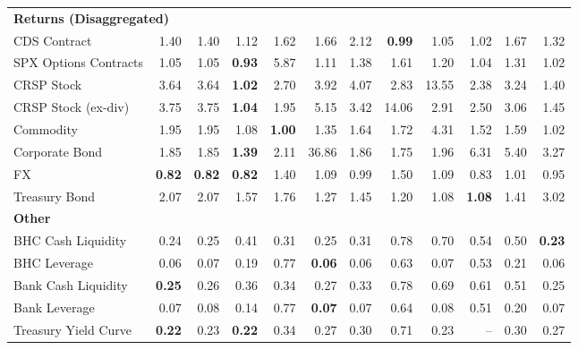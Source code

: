 \begin{table}[htbp]
\begin{tabular}{@{}lrrrrrrrrrrr@{}}
\midrule
\multicolumn{12}{l}{\textbf{Returns (Disaggregated)}} \\
CDS Contract & 1.40 & 1.40 & 1.12 & 1.62 & 1.66 & 2.12 & \textbf{0.99} & 1.05 & 1.02 & 1.67 & 1.32 \\
SPX Options Contracts & 1.05 & 1.05 & \textbf{0.93} & 5.87 & 1.11 & 1.38 & 1.61 & 1.20 & 1.04 & 1.31 & 1.02 \\
CRSP Stock & 3.64 & 3.64 & \textbf{1.02} & 2.70 & 3.92 & 4.07 & 2.83 & 13.55 & 2.38 & 3.24 & 1.40 \\
CRSP Stock (ex-div) & 3.75 & 3.75 & \textbf{1.04} & 1.95 & 5.15 & 3.42 & 14.06 & 2.91 & 2.50 & 3.06 & 1.45 \\
Commodity & 1.95 & 1.95 & 1.08 & \textbf{1.00} & 1.35 & 1.64 & 1.72 & 4.31 & 1.52 & 1.59 & 1.02 \\
Corporate Bond & 1.85 & 1.85 & \textbf{1.39} & 2.11 & 36.86 & 1.86 & 1.75 & 1.96 & 6.31 & 5.40 & 3.27 \\
FX & \textbf{0.82} & \textbf{0.82} & \textbf{0.82} & 1.40 & 1.09 & 0.99 & 1.50 & 1.09 & 0.83 & 1.01 & 0.95 \\
Treasury Bond & 2.07 & 2.07 & 1.57 & 1.76 & 1.27 & 1.45 & 1.20 & 1.08 & \textbf{1.08} & 1.41 & 3.02 \\
\midrule
\multicolumn{12}{l}{\textbf{Other}} \\
BHC Cash Liquidity & 0.24 & 0.25 & 0.41 & 0.31 & 0.25 & 0.31 & 0.78 & 0.70 & 0.54 & 0.50 & \textbf{0.23} \\
BHC Leverage & 0.06 & 0.07 & 0.19 & 0.77 & \textbf{0.06} & 0.06 & 0.63 & 0.07 & 0.53 & 0.21 & 0.06 \\
Bank Cash Liquidity & \textbf{0.25} & 0.26 & 0.36 & 0.34 & 0.27 & 0.33 & 0.78 & 0.69 & 0.61 & 0.51 & 0.25 \\
Bank Leverage & 0.07 & 0.08 & 0.14 & 0.77 & \textbf{0.07} & 0.07 & 0.64 & 0.08 & 0.51 & 0.20 & 0.07 \\
Treasury Yield Curve & \textbf{0.22} & 0.23 & \textbf{0.22} & 0.34 & 0.27 & 0.30 & 0.71 & 0.23 & -- & 0.30 & 0.27 \\
\bottomrule
\end{tabular}
\vspace{0.1cm}

\end{table}
